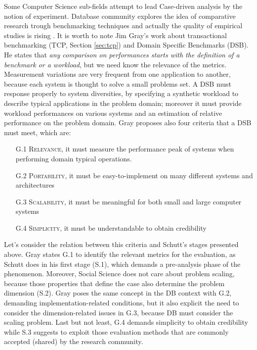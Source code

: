 Some Computer Science sub-fields attempt to lead Case-driven analysis by the notion of experiment. Database community explores the idea of comparative research trough benchmarking techniques and actually the quality of empirical studies is rising \cite{Wainer:2009:EEC:1518331.1518552}. It is worth to note Jim Gray's work about transactional benchmarking (TCP, Section \ref{sec:tcp}) and Domain Specific Benchmarks (DSB). He states that \textit{any comparison on performances starts with the definition of a benchmark or a workload}, but we need know the relevance of the metrics. Measurement variations are very frequent from one application to another, because each system is thought to solve a small problems set. A DSB must response properly to system diversities, by specifying a synthetic workload to describe typical applications in the problem domain; moreover it must provide workload performances on various systems and an estimation of relative performance on the problem domain.
Gray proposes also four criteria that a DSB must meet, which are:
\begin{enumerate}
\item[G.1] \textsc{Relevance}, it must measure the performance peak of systems when
performing domain typical operations.
\item[G.2] \textsc{Portability}, it must be easy-to-implement on many different systems and architectures
\item[G.3] \textsc{Scalability}, it must be meaningful for both small and large computer systems
\item[G.4] \textsc{Simplicity}, it must be understandable to obtain credibility
\end{enumerate} 

Let's consider the relation between this criteria and Schutt's stages presented above. Gray states G.1 to identify the relevant metrics for the evaluation, as Schutt does in his first stage (S.1), which demands a pre-analysis phase of the phenomenon. Moreover, Social Science does not care about problem scaling, because those properties that define the case also determine the problem dimension (S.2). Gray poses the same concept in the DB context with G.2, demanding implementation-related conditions, but it also explicit the need to consider the dimension-related issues in G.3, because DB must consider the scaling problem. Last but not least, G.4 demands simplicity to obtain credibility while S.3 suggests to exploit those evaluation methods that are commonly accepted (shared) by the research community. 

